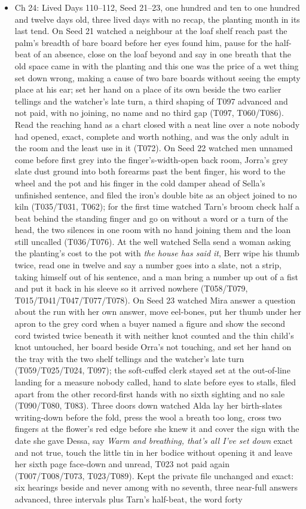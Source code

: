 \documentclass{design/chronicle}
\begin{document}
{\begin{itemize}[leftmargin=1.4em,itemsep=1pt,topsep=3pt,parsep=0pt]
\item Ch 24: Lived Days 110–112, Seed 21–23, one hundred and ten to one hundred and twelve days old, three lived days with no recap, the planting month in its last tend. On Seed 21 watched a neighbour at the loaf shelf reach past the palm’s breadth of bare board before her eyes found him, pause for the half-beat of an absence, close on the loaf beyond and say in one breath that the old space came in with the planting and this one was the price of a wet thing set down wrong, making a cause of two bare boards without seeing the empty place at his ear; set her hand on a place of its own beside the two earlier tellings and the watcher’s late turn, a third shaping of T097 advanced and not paid, with no joining, no name and no third gap (T097, T060/T086). Read the reaching hand as a chart closed with a neat line over a note nobody had opened, exact, complete and worth nothing, and was the only adult in the room and the least use in it (T072). On Seed 22 watched men unnamed come before first grey into the finger’s-width-open back room, Jorra’s grey slate dust ground into both forearms past the bent finger, his word to the wheel and the pot and his finger in the cold damper ahead of Sella’s unfinished sentence, and filed the iron’s double bite as an object joined to no kiln (T035/T031, T062); for the first time watched Tarn’s broom check half a beat behind the standing finger and go on without a word or a turn of the head, the two silences in one room with no hand joining them and the loan still uncalled (T036/T076). At the well watched Sella send a woman asking the planting’s cost to the pot with \emph{the house has said it}, Berr wipe his thumb twice, read one in twelve and say a number goes into a slate, not a strip, taking himself out of his sentence, and a man bring a number up out of a fist and put it back in his sleeve so it arrived nowhere (T058/T079, T015/T041/T047/T077/T078). On Seed 23 watched Mira answer a question about the run with her own answer, move eel-bones, put her thumb under her apron to the grey cord when a buyer named a figure and show the second cord twisted twice beneath it with neither knot counted and the thin child’s knot untouched, her board beside Orra’s not touching, and set her hand on the tray with the two shelf tellings and the watcher’s late turn (T059/T025/T024, T097); the soft-cuffed clerk stayed set at the out-of-line landing for a measure nobody called, hand to slate before eyes to stalls, filed apart from the other record-first hands with no sixth sighting and no sale (T090/T080, T083). Three doors down watched Alda lay her birth-slates writing-down before the fold, press the wool a breath too long, cross two fingers at the flower’s red edge before she knew it and cover the sign with the date she gave Dessa, say \emph{Warm and breathing, that’s all I’ve set down} exact and not true, touch the little tin in her bodice without opening it and leave her sixth page face-down and unread, T023 not paid again (T007/T008/T073, T023/T089). Kept the private file unchanged and exact: six hearings beside and never among with no seventh, three near-full answers advanced, three intervals plus Tarn’s half-beat, the word forty 
\end{itemize}}
\end{document}
